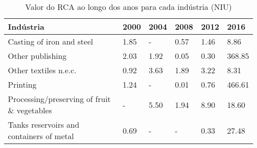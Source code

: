 \begin{table}
\centering
\caption{Valor do RCA ao longo dos anos para cada indústria (NIU)}
\begin{tabular}{p{6cm}p{1.5cm}p{1.5cm}p{1.5cm}p{1.5cm}p{1.5cm}}
\toprule
                                  Indústria & 2000 & 2004 & 2008 & 2012 &   2016 \\
\midrule
                  Casting of iron and steel & 1.85 &    - & 0.57 & 1.46 &   8.86 \\
                           Other publishing & 2.03 & 1.92 & 0.05 & 0.30 & 368.85 \\
                      Other textiles n.e.c. & 0.92 & 3.63 & 1.89 & 3.22 &   8.31 \\
                                   Printing & 1.24 &    - & 0.01 & 0.76 & 466.61 \\
Processing/preserving of fruit \& vegetables &    - & 5.50 & 1.94 & 8.90 &  18.60 \\
   Tanks reservoirs and containers of metal & 0.69 &    - &    - & 0.33 &  27.48 \\
\bottomrule
\end{tabular}
\end{table}
